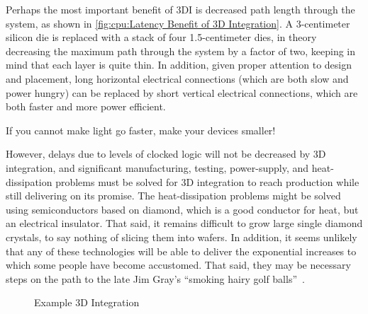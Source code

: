 Perhaps the most important benefit of 3DI is decreased path length through
the system, as shown in
\cref{fig:cpu:Latency Benefit of 3D Integration}.
A 3-centimeter silicon die is replaced with a stack of four 1.5-centimeter
dies, in theory decreasing the maximum path through the system by a factor
of two, keeping in mind that each layer is quite thin.
In addition, given proper attention to design and placement,
long horizontal electrical connections (which are both slow and
power hungry) can be replaced by short vertical electrical connections,
which are both faster and more power efficient.

If you cannot make light go faster, make your devices smaller!

However, delays due to levels of clocked logic will not be decreased
by 3D integration, and significant manufacturing, testing, power-supply,
and heat-dissipation problems must be solved for 3D integration to
reach production while still delivering on its promise.
The heat-dissipation problems might be solved using
semiconductors based on diamond, which is a good conductor
for heat, but an electrical insulator.
That said, it remains difficult to grow large single diamond crystals,
to say nothing of slicing them into wafers.
In addition, it seems unlikely that any of these technologies will be able to
deliver the exponential increases to which some people have become accustomed.
That said, they may be necessary steps on the path to the late Jim Gray's
``smoking hairy golf balls''~\cite{JimGray2002SmokingHairyGolfBalls}.

\begin{figure}
\centering
{}
\caption{Example 3D Integration}
\end{figure}

